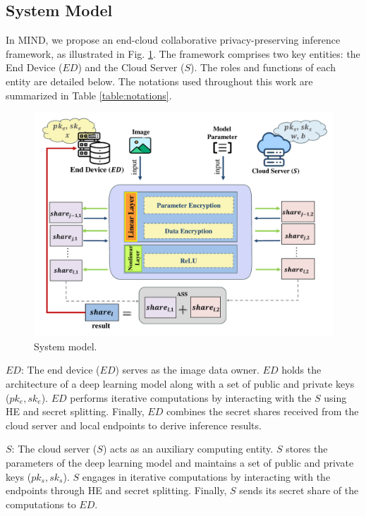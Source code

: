 \documentclass[conference]{IEEEtran}
\begin{document}
\subsection{System Model}
 In MIND, we propose an end-cloud collaborative privacy-preserving inference framework, as illustrated in Fig. \ref{fig:system_model}. The framework comprises two key entities: the End Device ($ED$) and the Cloud Server ($S$). The roles and functions of each entity are detailed below. The notations used throughout this work are summarized in Table \ref{table:notations}.
\begin{figure}[ht]
\includegraphics[width=1\linewidth]{fig1.pdf}
\caption{System model.} \label{fig:system_model}
\end{figure}

$ED$: The end device ($ED$) serves as the image data owner. $ED$ holds the architecture of a deep learning model along with a set of public and private keys ($pk_e,sk_e$). $ED$ performs iterative computations by interacting with the $S$ using HE and secret splitting. Finally, $ED$ combines the secret shares received from the cloud server and local endpoints to derive inference results.

$S$: The cloud server ($S$) acts as an auxiliary computing entity. $S$ stores the parameters of the deep learning model and maintains a set of public and private keys ($pk_s,sk_s$). $S$ engages in iterative computations by interacting with the endpoints through HE and secret splitting. Finally, $S$ sends its secret share of the computations to $ED$.

\end{document}

